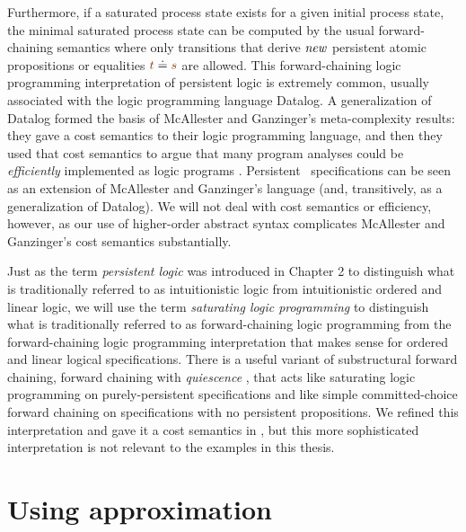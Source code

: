 Furthermore, if a saturated process state exists for a given initial
process state, the minimal saturated process state can be computed by
the usual forward-chaining semantics where only transitions that
derive ${\it new}$ persistent atomic propositions or equalities
$\lf{t} \doteq \lf{s}$ are allowed. This forward-chaining logic
programming interpretation of persistent logic is extremely common,
usually associated with the logic programming language
Datalog.  A generalization of Datalog formed the basis of McAllester
and Ganzinger's meta-complexity results: they gave a cost semantics to
their logic programming language, and then they used that cost
semantics to argue that many program analyses could be {\it
  efficiently} implemented as logic programs
\cite{mcallester02complexity,ganzinger02logical}. Persistent
\sls~specifications can be seen as an extension of McAllester and
Ganzinger's language (and, transitively, as a generalization of
Datalog). We will not deal with cost semantics or efficiency, however,
as our use of higher-order abstract syntax complicates McAllester and
Ganzinger's cost semantics substantially.

Just as the term {\it persistent logic} was introduced in Chapter 2 to
distinguish what is traditionally referred to as intuitionistic logic
from intuitionistic ordered and linear logic, we will use the term
{\it saturating logic programming} to distinguish what is
traditionally referred to as forward-chaining logic programming from
the forward-chaining logic programming interpretation that makes sense
for ordered and linear logical specifications. There is a useful
variant of substructural forward chaining, forward chaining with {\it
  quiescence} \cite{lopez05monadic}, that acts like saturating logic
programming on purely-persistent specifications and like simple
committed-choice forward chaining on specifications with no persistent
propositions. We refined this interpretation and gave it a cost
semantics in \cite{simmons08linear}, but this more sophisticated
interpretation is not relevant to the examples in this thesis.

\section{Using approximation}
\label{sec:pda-approxme}


